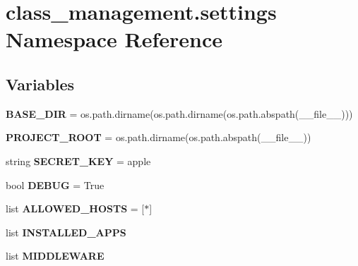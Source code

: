 \hypertarget{namespaceclass__management_1_1settings}{}\section{class\+\_\+management.\+settings Namespace Reference}
\label{namespaceclass__management_1_1settings}
\subsection*{Variables}
\begin{DoxyCompactItemize}
\item 
\hypertarget{namespaceclass__management_1_1settings_abd85690f93175b434f010ada27a1ec37}{}\label{namespaceclass__management_1_1settings_abd85690f93175b434f010ada27a1ec37} 
{\bfseries B\+A\+S\+E\+\_\+\+D\+IR} = os.\+path.\+dirname(os.\+path.\+dirname(os.\+path.\+abspath(\+\_\+\+\_\+file\+\_\+\+\_\+)))
\item 
\hypertarget{namespaceclass__management_1_1settings_a3111a82b998067eb982b55600a3560e2}{}\label{namespaceclass__management_1_1settings_a3111a82b998067eb982b55600a3560e2} 
{\bfseries P\+R\+O\+J\+E\+C\+T\+\_\+\+R\+O\+OT} = os.\+path.\+dirname(os.\+path.\+abspath(\+\_\+\+\_\+file\+\_\+\+\_\+))
\item 
\hypertarget{namespaceclass__management_1_1settings_a8ed1bcc2e73dea36167f798cf0fff0bd}{}\label{namespaceclass__management_1_1settings_a8ed1bcc2e73dea36167f798cf0fff0bd} 
string {\bfseries S\+E\+C\+R\+E\+T\+\_\+\+K\+EY} = \textquotesingle{}apple\textquotesingle{}
\item 
\hypertarget{namespaceclass__management_1_1settings_aa81b5cc7d0e095fc13d13f17ff29ee36}{}\label{namespaceclass__management_1_1settings_aa81b5cc7d0e095fc13d13f17ff29ee36} 
bool {\bfseries D\+E\+B\+UG} = True
\item 
\hypertarget{namespaceclass__management_1_1settings_a124c11ba4a4f897d154b80c48db0eb4f}{}\label{namespaceclass__management_1_1settings_a124c11ba4a4f897d154b80c48db0eb4f} 
list {\bfseries A\+L\+L\+O\+W\+E\+D\+\_\+\+H\+O\+S\+TS} = \mbox{[}\textquotesingle{}$\ast$\textquotesingle{}\mbox{]}
\item 
list {\bfseries I\+N\+S\+T\+A\+L\+L\+E\+D\+\_\+\+A\+P\+PS}
\item 
list {\bfseries M\+I\+D\+D\+L\+E\+W\+A\+RE}
\item 
\hypertarget{namespaceclass__management_1_1settings_aa61457d2930d1a1db179d060c23650ca}{}\label{namespaceclass__management_1_1settings_aa61457d2930d1a1db179d060c23650ca} 

\end{DoxyCompactItemize}
